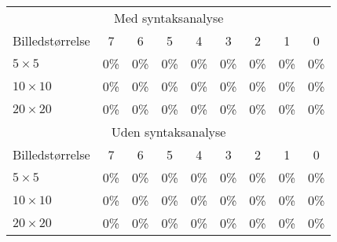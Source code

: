 \begin{tabular}{|l|c|c|c|c|c|c|c|c|}\hline
\rowcolor[gray]{0.9} \multicolumn{9}{|>{\columncolor[gray]{0.9}}c|}{\textbf{Kontrolsæt}} \\\hline
\multicolumn{9}{|c|}{Med syntaksanalyse}\\\hline
Billedstørrelse & 7 & 6 & 5 & 4 & 3 & 2 & 1 & 0\\\hline
$5 \times 5$ & 0\% & 0\% & 0\% & 0\% & 0\% & 0\% & 0\% & 0\% \\\hline
$10 \times 10$ & 0\% & 0\% & 0\% & 0\% & 0\% & 0\% & 0\% & 0\%\\\hline
$20 \times 20$ & 0\% & 0\% & 0\% & 0\% & 0\% & 0\% & 0\% & 0\%\\\hline 
\multicolumn{9}{|c|}{Uden syntaksanalyse}\\\hline
Billedstørrelse & 7 & 6 & 5 & 4 & 3 & 2 & 1 & 0\\\hline
$5 \times 5$ & 0\% & 0\% & 0\% & 0\% & 0\% & 0\% & 0\% & 0\% \\\hline
$10 \times 10$ & 0\% & 0\% & 0\% & 0\% & 0\% & 0\% & 0\% & 0\%\\\hline
$20 \times 20$ & 0\% & 0\% & 0\% & 0\% & 0\% & 0\% & 0\% & 0\%\\\hline \end{tabular}

\begin{comment}
\begin{tabular}{|l|c|c|c|}\hline
\rowcolor[gray]{0.9} \multicolumn{4}{|>{\columncolor[gray]{0.9}}c|}{\textbf{Træningssæt}} \\ \hline
Billedstørrelse & Alle tegn & Bogstaver & Tal \\\hline
$5 \times 5$ & 0\% & 0\% & 0\% \\\hline
$10 \times 10$ & 0\% & 0\% & 0\%\\\hline
$20 \times 20$ & 0\% & 0\% & 0\%\\\hline \end{tabular}

\begin{tabular}{|l|c|c|c|}\hline
\rowcolor[gray]{0.9} \multicolumn{4}{|>{\columncolor[gray]{0.9}}c|}{\textbf{Kontrolsæt}} \\ \hline
Billedstørrelse & Alle tegn & Bogstaver & Tal \\\hline
$5 \times 5$ & 0\% & 0\% & 0\% \\\hline
$10 \times 10$ & 0\% & 0\% & 0\%\\\hline
$20 \times 20$ & 0\% & 0\% & 0\%\\\hline \end{tabular}
\end{comment}


